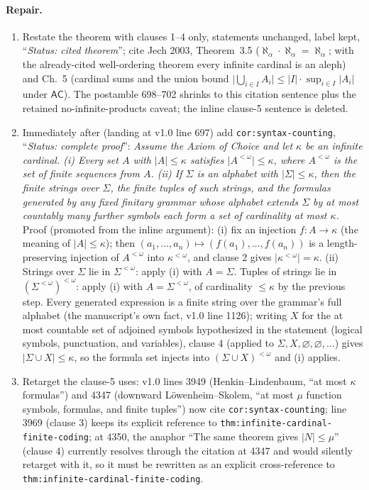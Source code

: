 \paragraph{Repair.}
\begin{enumerate}
\item Restate the theorem with clauses 1--4 only, statements unchanged, label kept, ``\emph{Status: cited theorem}''; cite Jech 2003, Theorem~3.5 (\(\aleph_\alpha\cdot\aleph_\alpha=\aleph_\alpha\); with the already-cited well-ordering theorem every infinite cardinal is an aleph) and Ch.~5 (cardinal sums and the union bound \(\lvert\bigcup_{i\in I}A_i\rvert\le\lvert I\rvert\cdot\sup_{i\in I}\lvert A_i\rvert\) under \(\mathsf{AC}\)).  The postamble 698--702 shrinks to this citation sentence plus the retained no-infinite-products caveat; the inline clause-5 sentence is deleted.
\item Immediately after (landing at v1.0 line 697) add \texttt{cor:syntax-counting}, ``\emph{Status: complete proof}'': \emph{Assume the Axiom of Choice and let \(\kappa\) be an infinite cardinal.  (i) Every set \(A\) with \(\lvert A\rvert\le\kappa\) satisfies \(\lvert A^{<\omega}\rvert\le\kappa\), where \(A^{<\omega}\) is the set of finite sequences from \(A\).  (ii) If \(\Sigma\) is an alphabet with \(\lvert\Sigma\rvert\le\kappa\), then the finite strings over \(\Sigma\), the finite tuples of such strings, and the formulas generated by any fixed finitary grammar whose alphabet extends \(\Sigma\) by at most countably many further symbols each form a set of cardinality at most \(\kappa\).}
Proof (promoted from the inline argument): (i) fix an injection \(f\colon A\to\kappa\) (the meaning of \(\lvert A\rvert\le\kappa\)); then \((a_1,\dots,a_n)\mapsto(f(a_1),\dots,f(a_n))\) is a length-preserving injection of \(A^{<\omega}\) into \(\kappa^{<\omega}\), and clause 2 gives \(\lvert\kappa^{<\omega}\rvert=\kappa\).  (ii) Strings over \(\Sigma\) lie in \(\Sigma^{<\omega}\): apply (i) with \(A=\Sigma\).  Tuples of strings lie in \((\Sigma^{<\omega})^{<\omega}\): apply (i) with \(A=\Sigma^{<\omega}\), of cardinality \(\le\kappa\) by the previous step.  Every generated expression is a finite string over the grammar's full alphabet (the manuscript's own fact, v1.0 line 1126); writing \(X\) for the at most countable set of adjoined symbols hypothesized in the statement (logical symbols, punctuation, and variables), clause 4 (applied to \(\Sigma,X,\varnothing,\varnothing,\dots\)) gives \(\lvert\Sigma\cup X\rvert\le\kappa\), so the formula set injects into \((\Sigma\cup X)^{<\omega}\) and (i) applies.
\item Retarget the clause-5 uses: v1.0 lines 3949 (Henkin--Lindenbaum, ``at most \(\kappa\) formulas'') and 4347 (downward L\"owenheim--Skolem, ``at most \(\mu\) function symbols, formulas, and finite tuples'') now cite \texttt{cor:syntax-counting}; line 3969 (clause 3) keeps its explicit reference to \texttt{thm:infinite-cardinal-finite-coding}; at 4350, the anaphor ``The same theorem gives \(\lvert N\rvert\le\mu\)'' (clause 4) currently resolves through the citation at 4347 and would silently retarget with it, so it must be rewritten as an explicit cross-reference to \texttt{thm:infinite-cardinal-finite-coding}.
\end{enumerate}

